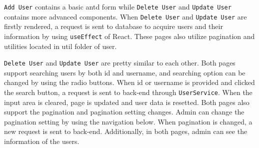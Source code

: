 \texttt{Add User} contains a basic antd form while \texttt{Delete User} and \texttt{Update User} contains more advanced components. When \texttt{Delete User} and \texttt{Update User} are firstly rendered, a request is sent to database to acquire users and their information by using \texttt{useEffect} of React. These pages also utilize pagination and utilities located in util folder of user.

\texttt{Delete User} and \texttt{Update User} are pretty similar to each other. Both pages support searching users by both id and username, and searching option can be changed by using the radio buttons. When id or username is provided and clicked the search button, a request is sent to back-end through \texttt{UserService}. When the input area is cleared, page is updated and user data is resetted. Both pages also support the pagination and pagination setting changes. Admin can change the pagination setting by using the navigation below. When pagination is changed, a new request is sent to back-end. Additionally, in both pages, admin can see the information of the users.

